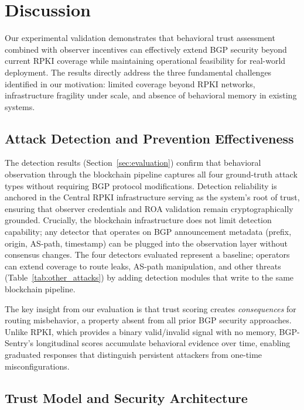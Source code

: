 \section{Discussion}
\label{sec:discussion}

Our experimental validation demonstrates that behavioral trust assessment combined with observer incentives can effectively extend BGP security beyond current RPKI coverage while maintaining operational feasibility for real-world deployment. The results directly address the three fundamental challenges identified in our motivation: limited coverage beyond RPKI networks, infrastructure fragility under scale, and absence of behavioral memory in existing systems.

\subsection{Attack Detection and Prevention Effectiveness}

The detection results (Section~\ref{sec:evaluation}) confirm that behavioral observation through the blockchain pipeline captures all four ground-truth attack types without requiring BGP protocol modifications. Detection reliability is anchored in the Central RPKI infrastructure serving as the system's root of trust, ensuring that observer credentials and ROA validation remain cryptographically grounded. Crucially, the blockchain infrastructure does not limit detection capability; any detector that operates on BGP announcement metadata (prefix, origin, AS-path, timestamp) can be plugged into the observation layer without consensus changes. The four detectors evaluated represent a baseline; operators can extend coverage to route leaks, AS-path manipulation, and other threats (Table~\ref{tab:other_attacks}) by adding detection modules that write to the same blockchain pipeline.

The key insight from our evaluation is that trust scoring creates \emph{consequences} for routing misbehavior, a property absent from all prior BGP security approaches. Unlike RPKI, which provides a binary valid/invalid signal with no memory, BGP-Sentry's longitudinal scores accumulate behavioral evidence over time, enabling graduated responses that distinguish persistent attackers from one-time misconfigurations.

\subsection{Trust Model and Security Architecture}

